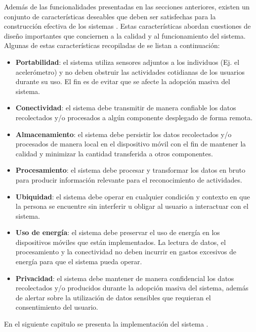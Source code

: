 \label{ssec46:caracteristicas}Además de las funcionalidades presentadas
en las secciones anteriores, existen un conjunto de características
deseables que deben ser satisfechas para la construcción efectiva
de los sistemas . Estas características abordan cuestiones
de diseño importantes que conciernen a la calidad y al funcionamiento
del sistema. Algunas de estas características recopiladas de \cite{Choudhury2008,LaraLabrador2013}
se listan a continuación:
\begin{itemize}
\item \textbf{Portabilidad}: el sistema utiliza sensores adjuntos a los
individuos (Ej. el acelerómetro) y no deben obstruir las actividades
cotidianas de los usuarios durante su uso. El fin es de evitar que
se afecte la adopción masiva del sistema. 
\item \textbf{Conectividad}: el sistema debe transmitir de manera confiable
los datos recolectados y/o procesados a algún componente desplegado
de forma remota. 
\item \textbf{Almacenamiento}: el sistema debe persistir los datos recolectados
y/o procesados de manera local en el dispositivo móvil con el fin
de mantener la calidad y minimizar la cantidad transferida a otros
componentes.
\item \textbf{Procesamiento}: el sistema debe procesar y transformar los
datos en bruto para producir información relevante para el reconocimiento
de actividades.
\item \textbf{Ubiquidad}: el sistema debe operar en cualquier condición
y contexto en que la persona se encuentre sin interferir u obligar
al usuario a interactuar con el sistema.
\item \textbf{Uso de energía}: el sistema debe preservar el uso de energía
en los dispositivos móviles que están implementados. La lectura de
datos, el procesamiento y la conectividad no deben incurrir en gastos
excesivos de energía para que el sistema pueda operar.
\item \textbf{Privacidad}: el sistema debe mantener de manera confidencial
los datos recolectados y/o producidos durante la adopción masiva del
sistema, además de alertar sobre la utilización de datos sensibles
que requieran el consentimiento del usuario.
\end{itemize}
En el siguiente capitulo se presenta la implementación del sistema
.
